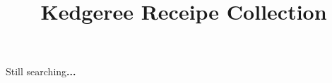\documentclass{article}
\begin{document}
\title{Kedgeree Receipe Collection}

\maketitle


Still searching\textbf{...}
\end{document}
